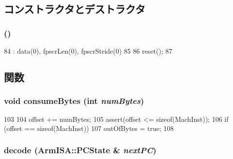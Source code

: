 \subsection{コンストラクタとデストラクタ}
\hypertarget{classArmISA_1_1Decoder_aedfa2b7d97ed17b14903ed75d6214c78}{
\subsubsection[{Decoder}]{ ()}}
\label{classArmISA_1_1Decoder_aedfa2b7d97ed17b14903ed75d6214c78}



\begin{DoxyCode}
84               : data(0), fpscrLen(0), fpscrStride(0)
85     {
86         reset();
87     }
\end{DoxyCode}


\subsection{関数}
\hypertarget{classArmISA_1_1Decoder_a34f1e4d13220afca8ec5c23596daba7e}{
\subsubsection[{consumeBytes}]{\setlength{\rightskip}{0pt plus 5cm}void consumeBytes (int {\em numBytes})}}
\label{classArmISA_1_1Decoder_a34f1e4d13220afca8ec5c23596daba7e}



\begin{DoxyCode}
103     {
104         offset += numBytes;
105         assert(offset <= sizeof(MachInst));
106         if (offset == sizeof(MachInst))
107             outOfBytes = true;
108     }
\end{DoxyCode}
\hypertarget{classArmISA_1_1Decoder_a516800185e8fbc3dd35db10f0c02ba9e}{
\subsubsection[{decode}]{ decode (ArmISA::PCState \& {\em nextPC})}}
\label{classArmISA_1_1Decoder_a516800185e8fbc3dd35db10f0c02ba9e}



